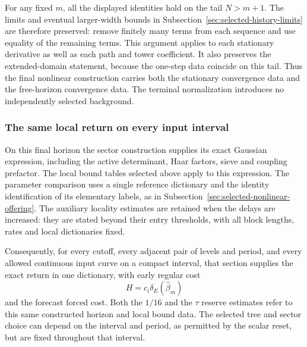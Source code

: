 For any fixed $m$, all the displayed identities hold on the tail
$N>m+1$. The limits and eventual larger-width bounds in
Subsection~\ref{sec:selected-history-limits} are therefore preserved:
remove finitely many terms from each sequence and use equality of the
remaining terms. This argument applies to each stationary derivative
as well as each path and tower coefficient. It also preserves the
extended-domain statement, because the one-step data coincide on this
tail. Thus the final nonlinear construction carries both the stationary
convergence data and the free-horizon convergence data. The terminal
normalization introduces no independently selected background.

\subsubsection{The same local return on every input interval}
On this final horizon the sector construction supplies its exact
Gaussian expression, including the active determinant, Haar factors,
sieve and coupling prefactor. The local bound tables selected above
apply to this expression. The parameter comparison uses a single
reference dictionary and the identity identification of its elementary
labels, as in Subsection~\ref{sec:selected-nonlinear-offering}.
The auxiliary locality estimates are retained when the delays are
increased: they are stated beyond their entry thresholds, with all
block lengths, rates and local dictionaries fixed.

Consequently, for every cutoff, every adjacent pair of levels and
period, and every allowed continuous input curve on a compact interval,
that section supplies the exact return in one dictionary, with early
regular cost
\[
                 H=c_i\delta_E(\widehat\beta_m)
\]
and the forecast forced cost. Both the $1/16$ and the $\tau$ reserve
estimates refer to this same constructed horizon and local bound data.
The selected tree and sector choice can depend on the interval and
period, as permitted by the scalar reset, but are fixed throughout
that interval.

